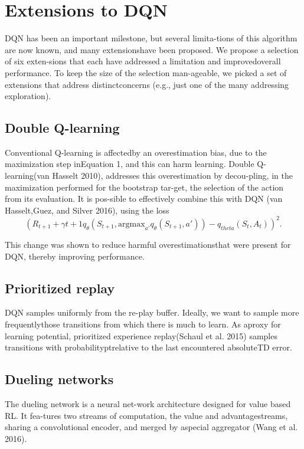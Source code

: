 \documentclass{article}
\begin{document}
\section{Extensions to DQN}
\quad DQN has been an important milestone, but several limita-tions of this algorithm are now known, and many extensionshave been proposed. We propose a selection of six exten-sions  that  each  have  addressed  a  limitation  and  improvedoverall performance. To keep the size of the selection man-ageable, we picked a set of extensions that address distinctconcerns (e.g., just one of the many addressing exploration).

\subsection{Double Q-learning}

Conventional Q-learning is affectedby an overestimation bias, due to the maximization step inEquation 1, and this can harm learning. Double Q-learning(van Hasselt 2010), addresses this overestimation by decou-pling, in the maximization performed for the bootstrap tar-get, the selection of the action from its evaluation. It is pos-sible  to  effectively  combine  this  with  DQN  (van  Hasselt,Guez, and Silver 2016), using the loss
$$(R_{t+1}+\gamma {t+1}q_{\theta}(S_{t+1},\text{argmax}_{a'} q_{\theta} (S_{t+1},a')) - q_{theta}(S_t,A_t))^2.$$

This change was shown to reduce harmful overestimationsthat were present for DQN, thereby improving performance.


\subsection{Prioritized replay}
\quad DQN samples uniformly from the re-play  buffer.  Ideally,  we  want  to  sample  more  frequentlythose  transitions  from  which  there  is  much  to  learn.  As  aproxy  for  learning  potential,  prioritized  experience  replay(Schaul et al. 2015) samples transitions with probabilityptrelative to the last encountered absoluteTD error.

\subsection{Dueling networks}
\quad The dueling network is a neural net-work  architecture  designed  for  value  based  RL.  It  fea-tures two streams of computation, the value and advantagestreams, sharing a convolutional encoder, and merged by aspecial aggregator (Wang et al. 2016). 
\end{document}
